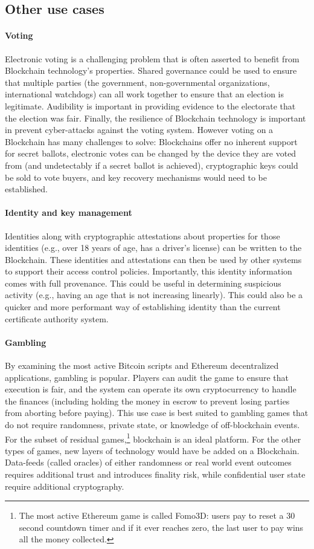 \subsection{Other use cases}

\paragraph{Voting}
Electronic voting is a challenging problem that is often asserted to benefit from Blockchain technology's properties.
Shared governance could be used to ensure that multiple parties (the government, non-governmental organizations, international watchdogs) can all work together to ensure that an election is legitimate.
Audibility is important in providing evidence to the electorate that the election was fair.
Finally, the resilience of Blockchain technology is important in prevent cyber-attacks against the voting system.
However voting on a Blockchain has many challenges to solve: Blockchains offer no inherent support for secret ballots, electronic votes can be changed by the device they are voted from (and undetectably if a secret ballot is achieved), cryptographic keys could be sold to vote buyers, and key recovery mechanisms would need to be established. 


\paragraph{Identity and key management}
Identities along with cryptographic attestations about properties for those identities (e.g., over 18 years of age, has a driver's license) can be written to the Blockchain.
These identities and attestations can then be used by other systems to support their access control policies.
Importantly, this identity information comes with full provenance. This could be useful in determining suspicious activity (e.g., having an age that is not increasing linearly).
This could also be a quicker and more performant way of establishing identity than the current certificate authority system.

\paragraph{Gambling}
By examining the most active Bitcoin scripts and Ethereum decentralized applications, gambling is popular. Players can audit the game to ensure that execution is fair, and the system can operate its own cryptocurrency to handle the finances (including holding the money in escrow to prevent losing parties from aborting before paying). This use case is best suited to gambling games that do not require randomness, private state, or knowledge of off-blockchain events. For the subset of residual games,\footnote{The most active Ethereum game is called Fomo3D: users pay to reset a 30 second countdown timer and if it ever reaches zero, the last user to pay wins all the money collected.} blockchain is an ideal platform. For the other types of games, new layers of technology would have be added on a Blockchain. Data-feeds (called oracles) of either randomness or real world event outcomes requires additional trust and introduces finality risk, while confidential user state require additional cryptography.  

